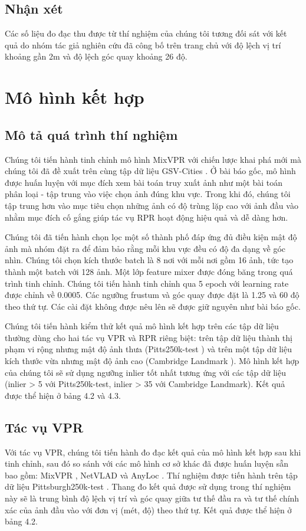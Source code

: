 \subsection*{Nhận xét}

Các số liệu đo đạc thu được từ thí nghiệm của chúng tôi tương đối sát với kết quả do nhóm tác giả nghiên cứu đã công bố trên trang chủ với độ lệch vị trí khoảng gần 2m và độ lệch góc quay khoảng 26 độ.

\section{Mô hình kết hợp}
\subsection*{Mô tả quá trình thí nghiệm}

Chúng tôi tiến hành tinh chỉnh mô hình MixVPR \cite{alibey2023mixvpr} với chiến lược khai phá mới mà chúng tôi đã đề xuất trên cùng tập dữ liệu GSV-Cities \cite{Ali_bey_2022}. Ở bài báo gốc, mô hình được huấn luyện với mục đích xem bài toán truy xuất ảnh như một bài toán phân loại - tập trung vào việc chọn ảnh đúng khu vực. Trong khi đó, chúng tôi tập trung hơn vào mục tiêu chọn những ảnh có độ trùng lặp cao với ảnh đầu vào nhằm mục đích cố gắng giúp tác vụ RPR hoạt động hiệu quả và dễ dàng hơn. 

Chúng tôi đã tiến hành chọn lọc một số thành phố đáp ứng đủ điều kiện mật độ ảnh mà nhóm đặt ra để đảm bảo rằng mỗi khu vực đều có độ đa dạng về góc nhìn. Chúng tôi chọn kích thước batch là 8 nơi với mỗi nơi gồm 16 ảnh, tức tạo thành một batch với 128 ảnh. Một lớp feature mixer được đóng băng trong quá trình tinh chỉnh. Chúng tôi tiến hành tinh chỉnh qua 5 epoch với learning rate được chỉnh về 0.0005. Các ngưỡng frustum và góc quay được đặt là 1.25 và 60 độ theo thứ tự. Các cài đặt không được nêu lên sẽ được giữ nguyên như bài báo gốc.

Chúng tôi tiến hành kiểm thử kết quả mô hình kết hợp trên các tập dữ liệu thường dùng cho hai tác vụ VPR và RPR riêng biệt: trên tập dữ liệu thành thị phạm vi rộng nhưng mật độ ảnh thưa (Pitts250k-test \cite{6618963}) và trên một tập dữ liệu kích thước vừa nhưng mật độ ảnh cao (Cambridge Landmark \cite{kendall2016posenet}). Mô hình kết hợp của chúng tôi sẽ sử dụng ngưỡng inlier tốt nhất tương ứng với các tập dữ liệu (inlier > 5 với Pitts250k-test, inlier > 35 với Cambridge Landmark). Kết quả được thể hiện ở bảng 4.2 và 4.3.

\subsection*{Tác vụ VPR}
Với tác vụ VPR, chúng tôi tiến hành đo đạc kết quả của mô hình kết hợp sau khi tinh chỉnh, sau đó so sánh với các mô hình cơ sở khác đã được huấn luyện sẵn bao gồm: MixVPR \cite{alibey2023mixvpr}, NetVLAD \cite{arandjelovic2016netvlad} và AnyLoc \cite{keetha2023anyloc}. Thí nghiệm được tiến hành trên tập dữ liệu Pittsburgh250k-test \cite{6618963}. Thang đo kết quả được sử dụng trong thí nghiệm này sẽ là trung bình độ lệch vị trí và góc quay giữa tư thế đầu ra và tư thế chính xác của ảnh đầu vào với đơn vị (mét, độ) theo thứ tự. Kết quả được thể hiện ở bảng 4.2.


